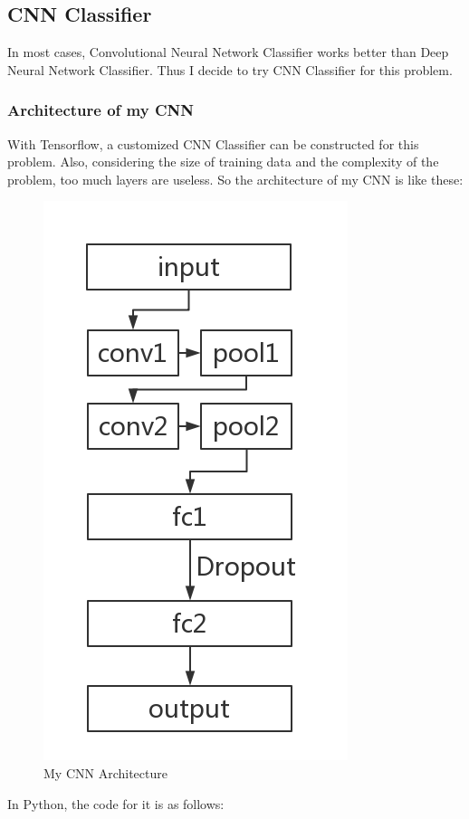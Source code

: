 \documentclass[a4paper]{article}
\begin{document}
        \subsection{CNN Classifier}
In most cases, Convolutional Neural Network Classifier works better than Deep Neural Network Classifier. Thus I decide to try CNN Classifier for this problem.

            \subsubsection{Architecture of my CNN}
With Tensorflow, a customized CNN Classifier can be constructed for this problem. Also, considering the size of training data and the complexity of the problem, too much layers are useless. So the architecture of my CNN is like these:
                \begin{figure}[H]
                \centering
                \includegraphics[width=.4\textwidth]{cnn.png}
                \caption{My CNN Architecture}
                \end{figure}
In Python, the code for it is as follows:
\end{document}
